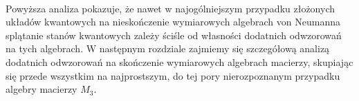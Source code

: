 \paragraph{}
Powyższa analiza pokazuje, że nawet w najogólniejszym przypadku złożonych
układów kwantowych na nieskończenie wymiarowych algebrach von Neumanna
splątanie stanów kwantowych zależy ściśle od własności dodatnich odwzorowań
na tych algebrach.
W następnym rozdziale zajmiemy się szczegółową analizą dodatnich odwzorowań
na skończenie wymiarowych algebrach macierzy, skupiając się przede wszystkim
na najprostszym, do tej pory nierozpoznanym przypadku algebry macierzy
$M_{3}$.
